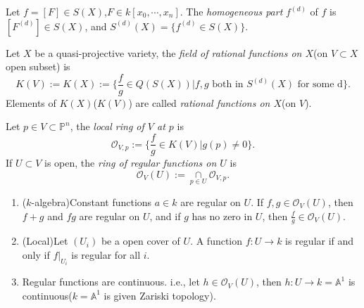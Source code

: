\begin{definition}
	Let $ f= [F]\in S(X) $,$ F\in k[x_0,\cdots,x_n] $. The \textit{homogeneous part} $ f^{(d)} $ of $ f $ is $ [F^{(d)}]\in S(X) $, and
	$ S^{(d)}(X) = \{ f^{(d)}\in S(X) \} $.
\end{definition}
\begin{definition}
	Let $ X $ be a quasi-projective variety, the \textit{field of rational functions on $ X $}(on $ V \subset X$ open subset) is
	$$ K(V):=K(X):=\{ \frac{f}{g}\in Q(S(X))|f,g \text{ both in } S^{(d)}(X) \text{ for some d} \} .$$
	Elements of $ K(X) $($ K(V) $) are called \textit{rational functions on $ X $}(on $ V $).
\end{definition}
\begin{definition}
	Let $ p\in V\subset\mathbb{P}^n $, the \textit{local ring of $ V $ at $ p $} is
	\begin{equation}
		\mathcal{O}_{V,p}:=\{ \frac{f}{g}\in K(V)|g(p)\neq 0 \}.
	\end{equation}
	If $ U\subset V $ is open, the \textit{ring of regular functions on $ U $} is
	\begin{equation}
		\mathcal{O}_V(U):=\mathop{\cap}\limits_{p\in U}\mathcal{O}_{V,p}.
	\end{equation}
\end{definition}
\begin{proposition}\label{8}
  {}
  \noindent
	\begin{enumerate}
		\item ($ k $-algebra)Constant functions $ a\in k $ are regular on $ U $. If $ f,g\in \mathcal{O}_V(U) $, then $ f+g $ and $ fg $ are regular on $ U $, and if $ g $ has no zero in $ U $, then $ \frac{f}{g} \in \mathcal{O}_{V}(U)$.
		\item (Local)Let $ (U_i) $ be a open cover of $ U $. A function $ f:U\to k $ is regular if and only if $ f|_{U_i} $ is regular for all $ i $.
		\item Regular functions are continuous. i.e., let $ h\in \mathcal{O}_V(U) $, then $ h:U\to k=\mathbb{A}^1 $ is continuous($ k=\mathbb{A}^1 $ is given Zariski topology).
	\end{enumerate}
\end{proposition}
